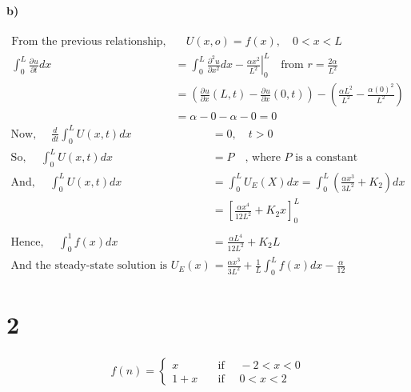 \documentclass[letterpaper,12pt,titlepage,oneside,final]{book}
\newcommand*{\pd}[3][]{\ensuremath{\frac{\partial^{#1} #2}{\partial #3}}}
\newcommand*{\ld}[3][]{\ensuremath{\frac{d^{#1} #2}{d #3}}}
\begin{document}
\paragraph{b)}
\begin{align*}
\text{From the previous relationship,}&\quad U(x,o) = f(x), \quad 0<x<L\\
\int_{0}^{L}\pd{u}{t}dx &= \int_{0}^{L}\pd[2]{u}{x^2}dx - \left.\frac{\alpha x^2}{L^2}\right|_{0}^{L} \quad \text{from }r = \frac{2\alpha}{L^2}\\
& = \left(\pd{u}{x}(L,t) - \pd{u}{x}(0,t)\right) - \left(\frac{\alpha L^2}{L^2} - \frac{\alpha (0)^2}{L^2} \right) \\
&= \alpha -0 -\alpha-0 =0
\end{align*}
\begin{align*}
\text{Now, }\quad \ld{}{t}\int_{0}^{L} U(x,t) dx &= 0,\quad t>0\\
\text{So, }\quad \int_{0}^{L} U(x,t)dx &= P \quad \text{, where $P$ is a constant}\\
\text{And, }\quad \int_{0}^{L} U(x,t)dx &= \int_{0}^{L} U_E(X) dx = \int_{0}^{L} \left(\frac{\alpha x^3}{3L^2} +K_2\right)dx\\
& = \left[\frac{\alpha x^4}{12 L^2} +K_2x \right]_{0}^{L}\\
\\
\text{Hence, }\quad \int_{0}^{1}f(x) dx &= \frac{\alpha L^4}{12L^2} + K_2L\\
\text{And the steady-state solution is } U_E(x) &= \frac{\alpha x^3}{3 L^2} + \frac{1}{L}\int_{0}^{L}f(x)dx -\frac{\alpha}{12}
\end{align*}
\cleardoublepage

\section*{2}
\begin{align*}
f(n) =
\begin{cases}
	x      & \quad \text{if }\quad -2<x<0\\
	1+x    & \quad \text{if }\quad 0<x<2
\end{cases}
\end{align*}
\cleardoublepage
\end{document}
